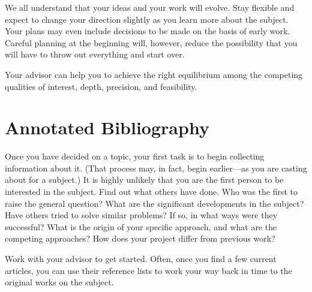 \documentclass[finalcopy]{srpaper}
\begin{document}
We all understand that your ideas and your work will
evolve. Stay flexible and expect to change your direction
slightly as you learn more about the subject. Your plans may
even include decisions to be made on the basis of early
work. Careful planning at the beginning will, however,
reduce the possibility that you will have to throw out
everything and start over.

Your advisor can help you to achieve the
right equilibrium among the competing qualities of
interest, depth, precision, and feasibility.


\section{Annotated Bibliography}
\label{Section:AnnotatedBibliography}
Once you have decided on a topic, your first task is to
begin collecting information about it. (That process may, in
fact, begin earlier---as you are casting about for a
subject.) It is highly unlikely that you are the first
person to be interested in the subject. Find out what others
have done. Who was the first to raise the general question?
What are the significant developments in the subject? Have
others tried to solve similar problems? If so, in what ways
were they successful? What is the origin of your specific
approach, and what are the competing approaches? How does
your project differ from previous work?

Work with your advisor to get started. Often, once you find
a few current articles, you can use their reference lists to
work your way back in time to the original works on the
subject.
\end{document}
